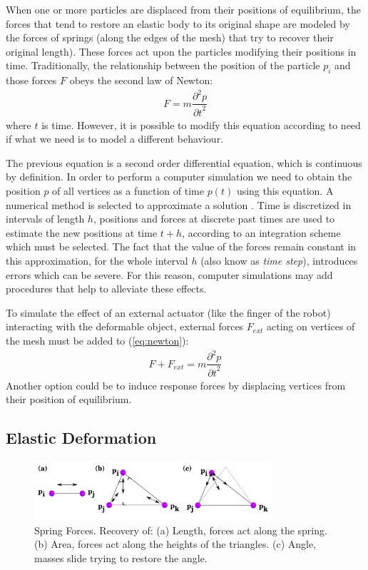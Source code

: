 \documentclass[journal]{IEEEtran}
\newcommand{\eref}[1]{(\ref{#1})}
\begin{document}
{When one or more particles are displaced from their positions of equilibrium, the forces that tend to restore an elastic body to its original shape are modeled by the forces of springs (along the edges of the mesh) that try to recover their original length).  These forces act upon the particles modifying their positions in time.  Traditionally, the relationship between the position of the particle $p_i$ and those forces $F$ obeys the second law of Newton:
\begin{align}
 F = m \dfrac{\partial^2 p}{{\partial t}^2} \label{eq:newton}
\end{align}
where $t$ is time.  However, it is possible to modify this equation according to need if what we need is to model a different behaviour. %

The previous equation is a second order differential equation, which is continuous by definition.  In order to perform a computer simulation we need to obtain the position $p$ of all vertices as a function of time $p(t)$ using this equation.  A numerical method is selected to approximate a solution \cite{Nealen2006review}.  Time is discretized in intervals of length $h$, positions and forces at discrete past times are used to estimate the new positions at time $t + h$, according to an integration scheme which must be selected.  The fact that the value of the forces remain constant in this approximation, for the whole interval $h$ (also know as \textit{time step}), introduces errors which can be severe.  For this reason, computer simulations may add procedures that help to alleviate these effects.  

To simulate the effect of an external actuator (like the finger of the robot) interacting with the deformable object, external forces $F_{ext}$ acting on vertices of the mesh must be added to \eref{eq:newton}:
\begin{align}
 F + F_{ext} = m \dfrac{\partial^2 p}{{\partial t}^2}
\end{align}
Another option could be to induce response forces by displacing vertices from their position of equilibrium.
}

\label{sec:model}
\subsection{Elastic Deformation}

\begin{figure}[!t]
\centering
\includegraphics[width=88mm]{arrio1}
\caption{Spring Forces. Recovery of: (a) Length, forces act along the spring.  (b) Area, forces act along the heights of the triangles. (c) Angle, masses slide trying to restore the angle.}
\label{fig:forces}
\end{figure}
\end{document}
